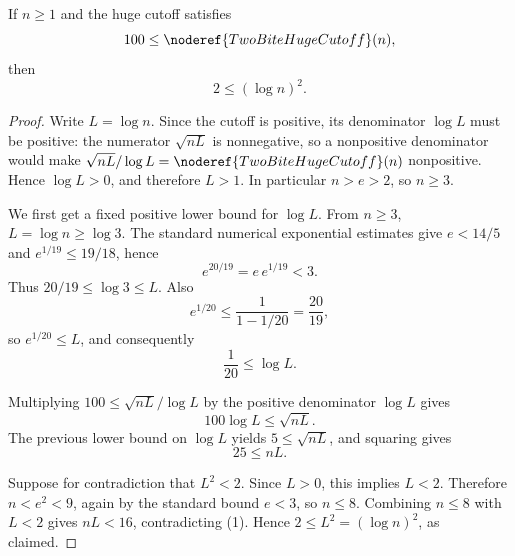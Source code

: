 \begin{helper}
If \(n\ge 1\) and the huge cutoff satisfies
\[
100\le \noderef{TwoBiteHugeCutoff}(n),
\]
then
\[
2\le (\log n)^2.
\]
\end{helper}
\begin{proof}
Write \(L=\log n\).  Since the cutoff is positive, its denominator
\(\log L\) must be positive: the numerator \(\sqrt{nL}\) is nonnegative, so a
nonpositive denominator would make
\(\sqrt{nL}/\log L=\noderef{TwoBiteHugeCutoff}(n)\) nonpositive.  Hence
\(\log L>0\), and therefore \(L>1\).  In particular \(n>e>2\), so \(n\ge3\).

We first get a fixed positive lower bound for \(\log L\).  From \(n\ge3\),
\(L=\log n\ge\log3\).  The standard numerical exponential estimates give
\(e<14/5\) and \(e^{1/19}\le19/18\), hence
\[
e^{20/19}=e\,e^{1/19}<3.
\]
Thus \(20/19\le\log3\le L\).  Also
\[
e^{1/20}\le \frac1{1-1/20}=\frac{20}{19},
\]
so \(e^{1/20}\le L\), and consequently
\[
\frac1{20}\le \log L.
\]

Multiplying \(100\le \sqrt{nL}/\log L\) by the positive denominator
\(\log L\) gives
\[
100\log L\le\sqrt{nL}.
\]
The previous lower bound on \(\log L\) yields \(5\le\sqrt{nL}\), and squaring
gives
\[
25\le nL. \tag{1}
\]

Suppose for contradiction that \(L^2<2\).  Since \(L>0\), this implies
\(L<2\).  Therefore \(n<e^2<9\), again by the standard bound \(e<3\), so
\(n\le8\).  Combining \(n\le8\) with \(L<2\) gives \(nL<16\), contradicting
(1).  Hence \(2\le L^2=(\log n)^2\), as claimed.
\end{proof}
